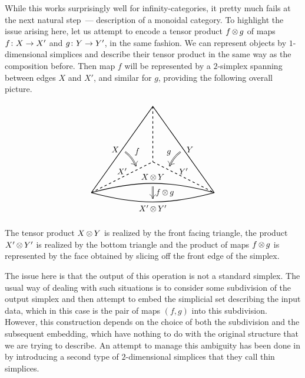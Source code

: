 \documentclass[letterpaper,12pt,leqno]{article}
\numberwithin{equation}{theorem}
\begin{document}
\begin{nparagraph}
While this works surprisingly well for infinity-categories, it pretty much fails at the next natural step~--- description of a monoidal category. To highlight the issue arising here,
let us attempt to encode a tensor product $f \mathop{\otimes}\limits g$ of maps $f\colon X \to X' $ and $g\colon Y \to Y'$, in the same fashion. We can represent objects by $1$-dimensional simplices and
describe their tensor product in the same way as the composition before. Then map $f$ will be represented by a $2$-simplex spanning between edges $X$ and $X'$, and similar for $g$,
providing the following overall picture.

$$
\begin{tikzpicture}
\def\u{15em}
\node (a) at (0, 0) {};
\node (b) at (0.5*\u, 0.7*\u) {};
\node (c) at (1*\u, 0) {};
\node (d) at (0.5*\u, 0.25*\u) {};
\draw [thick] (a.center) -- node [midway,left] {$X$} node [midway] (ab) {} (b.center) -- node [midway,right] {$Y$} node [midway] (bc) {} (c.center);
\draw [thick, dashed] (a.center) --node [midway, above] {$X'$} node [near end] (ad) {} (d.center) -- node [midway,above] {$Y'$} node [near start] (dc) {} (c.center);
\draw [double distance=0.1em, arrows={->[width=0.9em]}] (ab) to [bend left=15] node [midway,above right] {$f$} (ad);
\draw [double distance=0.1em, arrows={->[width=0.9em]}] (bc) to [bend right=15] node [midway, above left] {$g$} (dc);
\draw [thick, dashed] (b.center) -- (d.center);
\draw [thick] (a.center) to [bend left=15] node [midway,above] {$X \tensor Y$} node (acu) [midway] {} (c.center);
\draw [thick] (a.center) to [bend right=15] node [midway,below] {$X' \tensor Y'$} node (acd) [midway] {} (c.center);
\draw [double distance=0.1em, arrows={->[width=0.8em]}] (acu) -- (acd) node [midway,right] {$f \tensor g$};
\end{tikzpicture}
$$

The tensor product $X \mathop{\otimes}\limits Y$ is realized by the front facing triangle, the product $X' \mathop{\otimes}\limits Y'$ is realized by the bottom triangle and the product of maps $f \mathop{\otimes}\limits g$
is represented by the face obtained by slicing off the front edge of the simplex.

The issue here is that the output of this operation is not a standard simplex. The usual way of dealing with such situations is to consider some subdivision of the output simplex
and then attempt to embed the simplicial set describing the input data, which in this case is the pair of maps $(f, g)$ into this subdivision. However, this construction depends on the choice
of both the subdivision and the subsequent embedding, which have nothing to do with the original structure that we are trying to describe. An attempt to manage this ambiguity has been
done in \cite{Lurie} by introducing a second type of $2$-dimensional simplices that they call thin simplices.

\end{nparagraph}
\end{document}
